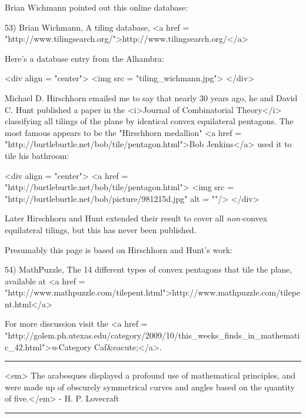 Brian Wichmann pointed out this online database:

53) Brian Wichmann, A tiling database, 
<a href = "http://www.tilingsearch.org/">http://www.tilingsearch.org/</a>

Here's a database entry from the Alhambra:

<div align = "center">
<img src = "tiling_wichmann.jpg">
</div>

Michael D. Hirschhorn emailed me to say that nearly 30 years ago, he
and David C. Hunt published a paper in the <i>Journal of Combinatorial
Theory</i> classifying all tilings of the plane by identical convex
equilateral pentagons.  The most famous appears to be the "Hirschhorn
medallion"  <a href =
"http://burtleburtle.net/bob/tile/pentagon.html">Bob Jenkins</a> used
it to tile his bathroom:

<div align = "center">
<a href = "http://burtleburtle.net/bob/tile/pentagon.html">
<img src = "http://burtleburtle.net/bob/picture/981215d.jpg" alt = ""/>
</div>

Later Hirschhorn and Hunt extended their result to cover all
\emph{non-}convex equilateral tilings, but this has never been
published.

Presumably this page is based on Hirschhorn and Hunt's work:

54) MathPuzzle, The 14 different types of convex pentagons that tile
the plane, available at <a href =
"http://www.mathpuzzle.com/tilepent.html">http://www.mathpuzzle.com/tilepent.html</a>

For more discussion visit the <a href =
"http://golem.ph.utexas.edu/category/2009/10/this_weeks_finds_in_mathematic_42.html">\emph{n}-Category
Caf&eacute;</a>.

\par\noindent\rule{\textwidth}{0.4pt}

<em>
The arabesques displayed a profound use of mathematical principles, and were made up
of obscurely symmetrical curves and angles based on the quantity of five.</em> -
H. P. Lovecraft


\par\noindent\rule{\textwidth}{0.4pt}

